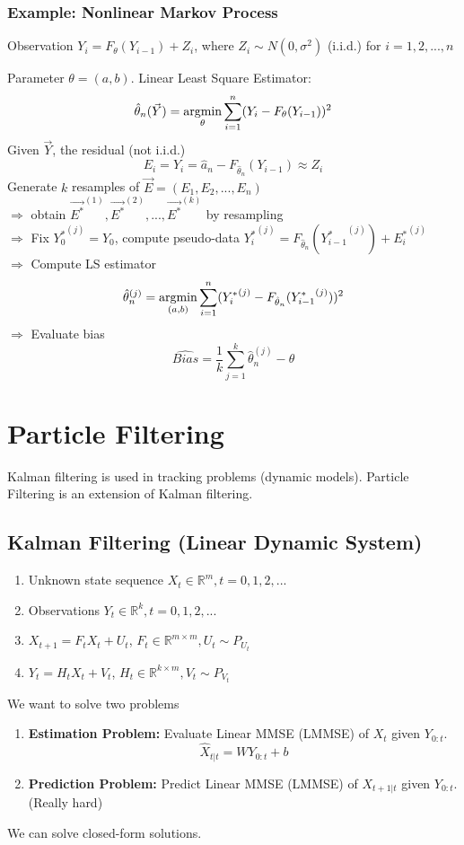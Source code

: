 \documentclass[11pt,a4paper]{article}
\newcommand{\argmin}{\operatornamewithlimits{argmin}}
\begin{document}
\subsubsection*{Example: Nonlinear Markov Process}
Observation $Y_i=F_{\theta}(Y_{i-1})+Z_i$, where $Z_i\sim N(0,\sigma^2)$ (i.i.d.) for $i=1,2,...,n$

Parameter $\theta=(a,b)$. Linear Least Square Estimator:
$$\hat{\theta}_n(\vec{Y})=\argmin_{\theta}\sum_{i=1}^n(Y_i-F_{\theta}(Y_{i-1}))^2$$
Given $\vec{Y}$, the residual (not i.i.d.)$$E_i=Y_i=\hat{a}_n-F_{\hat{\theta}_n}(Y_{i-1})\approx Z_i$$
Generate $k$ resamples of $\vec{E}=(E_1,E_2,...,E_n)$\\
$\Rightarrow$ obtain $\vec{E^*}^{(1)},\vec{E^*}^{(2)},...,\vec{E^*}^{(k)}$ by resampling\\
$\Rightarrow$ Fix ${Y_0^*}^{(j)}=Y_0$, compute pseudo-data ${Y_i^*}^{(j)}=F_{\hat{\theta}_n}({Y^*_{i-1}}^{(j)})+{E_i^*}^{(j)}$\\
$\Rightarrow$ Compute LS estimator $$\hat{\theta}_n^{(j)}=\argmin_{(a,b)}\sum_{i=1}^n({Y_i^*}^{(j)}-F_{\hat{\theta}_n}({Y^*_{i-1}}^{(j)}))^2$$
$\Rightarrow$ Evaluate bias $$\widehat{Bias}=\frac{1}{k}\sum_{j=1}^k \hat{\theta}_n^{(j)}-\theta$$


\section{Particle Filtering}
Kalman filtering is used in tracking problems (dynamic models). Particle Filtering is an extension of Kalman filtering.
\subsection{Kalman Filtering (Linear Dynamic System)}
\begin{enumerate}
    \item Unknown state sequence $X_t\in \mathbb{R}^m,t=0,1,2,...$
    \item Observations $Y_t\in \mathbb{R}^k,t=0,1,2,...$
    \item $X_{t+1}=F_tX_t+U_t$, $F_t\in \mathbb{R}^{m\times m}, U_t\sim P_{U_t}$
    \item $Y_t=H_tX_t+V_t$, $H_t\in \mathbb{R}^{k\times m}, V_t\sim P_{V_t}$
\end{enumerate}

We want to solve two problems
\begin{enumerate}
    \item \textbf{Estimation Problem:} Evaluate Linear MMSE (LMMSE) of $X_t$ given $Y_{0:t}$. $$\hat{X}_{t|t}=WY_{0:t}+b$$
    \item \textbf{Prediction Problem:} Predict Linear MMSE (LMMSE) of $X_{t+1|t}$ given $Y_{0:t}$. (Really hard)
\end{enumerate}
We can solve closed-form solutions.
\end{document}
